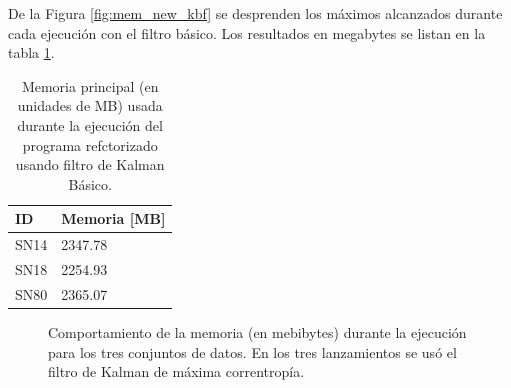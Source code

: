 De la Figura \ref{fig:mem_new_kbf} se desprenden los m\'aximos alcanzados durante cada ejecuci\'on con el filtro b\'asico. Los resultados en megabytes se listan en la tabla \ref{tab:mem3}.
\pagebreak

\begin{table}[h!]
\centering
\caption{Memoria principal (en unidades de MB) usada durante la ejecuci\'on del programa refctorizado usando filtro de Kalman B\'asico.}
\begin{tabular}{|l|l|}
\hline
\textbf{ID} & Memoria [MB]\\\hline\hline
SN14 & 2347.78\\\hline
SN18 & 2254.93\\\hline
SN80 & 2365.07\\\hline
\end{tabular}
\label{tab:mem3}
\end{table}


\begin{figure}[h!]
\centering
{}\hfill
{}\vfill
{}
\caption{Comportamiento de la memoria (en mebibytes) durante la ejecuci\'on para los tres conjuntos de datos. En los tres lanzamientos se us\'o el filtro de Kalman de m\'axima correntrop\'ia.}
\label{fig:mem_new_mcc}
\end{figure}

